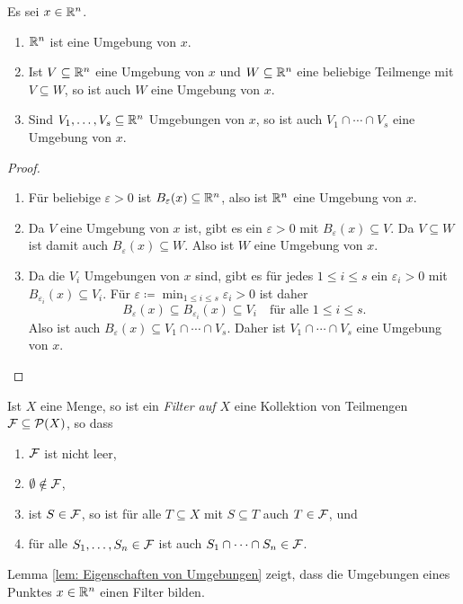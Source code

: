 \documentclass[a4paper,10pt]{article}
\begin{document}
\begin{lem}\label{lem: Eigenschaften von Umgebungen}
 Es sei $x \in \mathbb{R}^n$.
 \begin{enumerate}
  \item
   $\mathbb{R}^n$ ist eine Umgebung von $x$.
  \item
   Ist $V \subseteq \mathbb{R}^n$ eine Umgebung von $x$ und $W \subseteq \mathbb{R}^n$ eine beliebige Teilmenge mit $V \subseteq W$, so ist auch $W$ eine Umgebung von $x$.
  \item
   Sind $V_1, \dotsc, V_s \subseteq \mathbb{R}^n$ Umgebungen von $x$, so ist auch $V_1 \cap \dotsb \cap V_s$ eine Umgebung von $x$.
 \end{enumerate}
\end{lem}
\begin{proof}
 \begin{enumerate}
  \item
   Für beliebige $\varepsilon > 0$ ist $B_\varepsilon(x) \subseteq \mathbb{R}^n$, also ist $\mathbb{R}^n$ eine Umgebung von $x$.
  \item
   Da $V$ eine Umgebung von $x$ ist, gibt es ein $\varepsilon > 0$ mit $B_\varepsilon(x) \subseteq V$. Da $V \subseteq W$ ist damit auch $B_\varepsilon(x) \subseteq W$. Also ist $W$ eine Umgebung von $x$.
  \item
   Da die $V_i$ Umgebungen von $x$ sind, gibt es für jedes $1 \leq i \leq s$ ein $\varepsilon_i  > 0$ mit $B_{\varepsilon_i}(x) \subseteq V_i$. Für $\varepsilon \coloneqq \min_{1 \leq i \leq s} \varepsilon_i > 0$ ist daher
   \[
    B_\varepsilon(x) \subseteq B_{\varepsilon_i}(x) \subseteq V_i
    \quad \text{für alle $1 \leq i \leq s$}.
   \]
   Also ist auch $B_\varepsilon(x) \subseteq V_1 \cap \dotsb \cap V_s$. Daher ist $V_1 \cap \dotsb \cap V_s$ eine Umgebung von $x$.
  \qedhere
 \end{enumerate}
\end{proof}


\begin{bem}
 Ist $X$ eine Menge, so ist ein \emph{Filter auf $X$} eine Kollektion von Teilmengen $\mathcal{F} \subseteq \mathcal{P}(X)$, so dass
 \begin{enumerate}
  \item
   $\mathcal{F}$ ist nicht leer,
  \item
   $\emptyset \notin \mathcal{F}$,
  \item
   ist $S \in \mathcal{F}$, so ist für alle $T \subseteq X$ mit $S \subseteq T$ auch $T \in \mathcal{F}$, und
  \item
   für alle $S_1, \dotsc, S_n \in \mathcal{F}$ ist auch $S_1 \cap \dotsb \cap S_n \in \mathcal{F}$.
 \end{enumerate}
 Lemma \ref{lem: Eigenschaften von Umgebungen} zeigt, dass die Umgebungen eines Punktes $x \in \mathbb{R}^n$ einen Filter bilden.
\end{bem}
\end{document}
